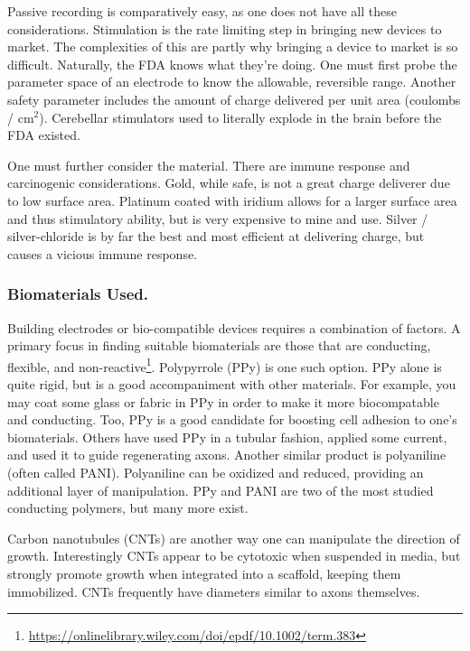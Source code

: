 Passive recording is comparatively easy, as one does not have all these considerations. Stimulation is the rate limiting step in bringing new devices to market. The complexities of this are partly why bringing a device to market is so difficult. Naturally, the FDA knows what they're doing. One must first probe the parameter space of an electrode to know the allowable, reversible range. Another safety parameter includes the amount of charge delivered per unit area (coulombs / cm$^2$). Cerebellar stimulators used to literally explode in the brain before the FDA existed.\newline

One must further consider the material. There are immune response and carcinogenic considerations. Gold, while safe, is not a great charge deliverer due to low surface area. Platinum coated with iridium allows for a larger surface area and thus stimulatory ability, but is very expensive to mine and use. Silver / silver-chloride is by far the best and most efficient at delivering charge, but causes a vicious immune response.



\subsubsection{Biomaterials Used.}
Building electrodes or bio-compatible devices requires a combination of factors. A primary focus in finding suitable biomaterials are those that are conducting, flexible, and non-reactive\footnote{\url{https://onlinelibrary.wiley.com/doi/epdf/10.1002/term.383}}. Polypyrrole (PPy) is one such option. PPy alone is quite rigid, but is a good accompaniment with other materials. For example, you may coat some glass or fabric in PPy in order to make it more biocompatable and conducting. Too, PPy is a good candidate for boosting cell adhesion to one's biomaterials. Others have used PPy in a tubular fashion, applied some current, and used it to guide regenerating axons. Another similar product is polyaniline (often called PANI). Polyaniline can be oxidized and reduced, providing an additional layer of manipulation. PPy and PANI are two of the most studied conducting polymers, but many more exist.\newline

Carbon nanotubules (CNTs) are another way one can manipulate the direction of growth. Interestingly CNTs appear to be cytotoxic when suspended in media, but strongly promote growth when integrated into a scaffold, keeping them immobilized. CNTs frequently have diameters similar to axons themselves.\newline

